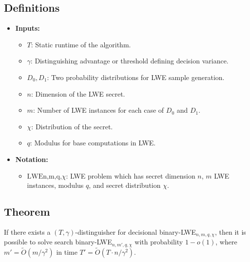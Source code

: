\documentclass{article}
\begin{document}
    \subsection*{Definitions}
    \begin{itemize}
        \item \textbf{Inputs:}
        \begin{itemize}
            \item \( T \): Static runtime of the algorithm.
            \item \( \gamma \): Distinguishing advantage or threshold defining decision variance.
            \item \( D_0, D_1 \): Two probability distributions for LWE sample generation.
            \item \( n \): Dimension of the LWE secret.
            \item \( m \): Number of LWE instances for each case of \( D_0 \) and \( D_1 \).
            \item \( \chi \): Distribution of the secret.
            \item \( q \): Modulus for base computations in LWE.
        \end{itemize}
        \item \textbf{Notation:}
        \begin{itemize}
            \item \( \text{LWEn,m,q,} \chi \): LWE problem which has secret dimension \( n \), \( m \) LWE instances, modulus \( q \), and secret distribution \( \chi \).
        \end{itemize}
    \end{itemize}

    \subsection*{Theorem}
    If there exists a \((T, \gamma)\)-distinguisher for decisional binary-LWE\(_{n,m,q,\chi}\), then it is possible to solve search binary-LWE\(_{n,m',q,\chi}\) with probability \( 1 - o(1) \), where \( m' = \tilde{O}(m/\gamma^2) \) in time \( T' = \tilde{O}(T \cdot n / \gamma^2) \).
\end{document}
